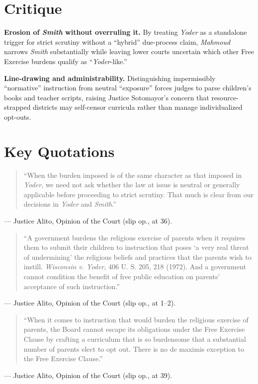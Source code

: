 \documentclass[12pt]{article}
\begin{document}
\section{Critique}

\textbf{Erosion of \textit{Smith} without overruling it.} By treating \textit{Yoder} as a standalone trigger for strict scrutiny without a ``hybrid'' due-process claim, \textit{Mahmoud} narrows \textit{Smith} substantially while leaving lower courts uncertain which other Free Exercise burdens qualify as ``\textit{Yoder}-like.''

\textbf{Line-drawing and administrability.} Distinguishing impermissibly ``normative'' instruction from neutral ``exposure'' forces judges to parse children's books and teacher scripts, raising Justice Sotomayor's concern that resource-strapped districts may self-censor curricula rather than manage individualized opt-outs.

\section{Key Quotations}

\begin{quote}
``When the burden imposed is of the same character as that imposed in \textit{Yoder}, we need not ask whether the law at issue is neutral or generally applicable before proceeding to strict scrutiny. That much is clear from our decisions in \textit{Yoder} and \textit{Smith}.''
\end{quote}
\noindent --- Justice Alito, Opinion of the Court (slip op., at 36).

\begin{quote}
``A government burdens the religious exercise of parents when it requires them to submit their children to instruction that poses `a very real threat of undermining' the religious beliefs and practices that the parents wish to instill. \textit{Wisconsin v. Yoder}, 406 U. S. 205, 218 (1972). And a government cannot condition the benefit of free public education on parents' acceptance of such instruction.''
\end{quote}
\noindent --- Justice Alito, Opinion of the Court (slip op., at 1--2).

\begin{quote}
``When it comes to instruction that would burden the religious exercise of parents, the Board cannot escape its obligations under the Free Exercise Clause by crafting a curriculum that is so burdensome that a substantial number of parents elect to opt out. There is no de maximis exception to the Free Exercise Clause.''
\end{quote}
\noindent --- Justice Alito, Opinion of the Court (slip op., at 39).
\end{document}
